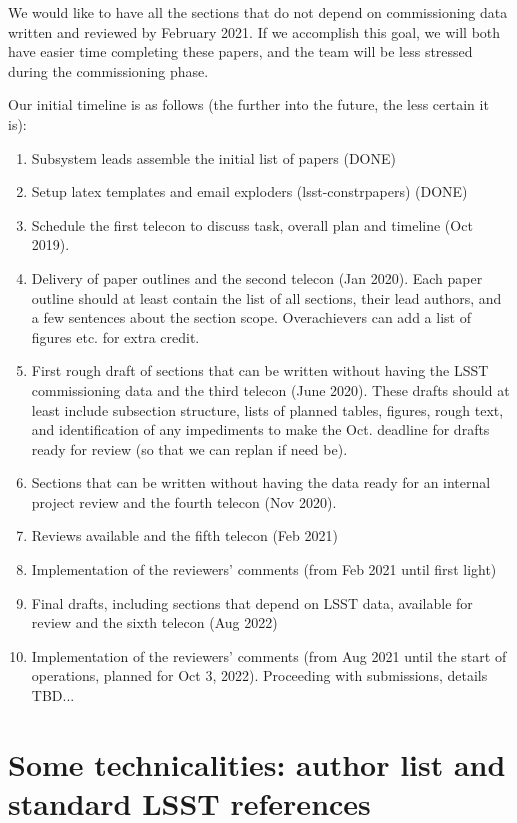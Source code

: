 We would like to have all the sections that do not depend on commissioning data 
written and reviewed by February 2021. If we accomplish this goal, we will both
have easier time completing these papers, and the team will be less stressed during
the commissioning phase. 

Our initial timeline is as follows (the further into the future, the less certain it is): 
\begin{enumerate} 
\item 
Subsystem leads assemble the initial list of papers (DONE)
\item
Setup latex templates and email exploders (lsst-constrpapers) (DONE)
\item
Schedule the first telecon to discuss task, overall plan and timeline (Oct 2019).
\item 
Delivery of paper outlines and the second telecon (Jan 2020). Each paper
outline should at least contain the list of all sections, their lead authors, and
a few sentences about the section scope. Overachievers can add a list of figures etc.
for extra credit. 
\item
First rough draft of sections that can be written without having the LSST commissioning
data and the third telecon (June 2020). These drafts should at least include subsection
structure, lists of planned tables, figures, rough text,  and identification of any impediments 
to make the Oct. deadline for drafts ready for review (so that we can replan if need be). 
\item 
Sections that can be written without having the data ready for an internal project review and
the fourth telecon (Nov 2020). 
\item
Reviews available and the fifth telecon (Feb 2021)
\item
Implementation of the reviewers' comments (from Feb 2021 until first light) 
\item 
Final drafts, including sections that depend on LSST data, available for
review and the sixth telecon (Aug 2022)
\item
Implementation of the reviewers' comments (from Aug 2021 until the start of operations, 
planned for Oct 3, 2022).  Proceeding with submissions, details TBD...
\end{enumerate}




\section{Some technicalities: author list and standard LSST references} 

